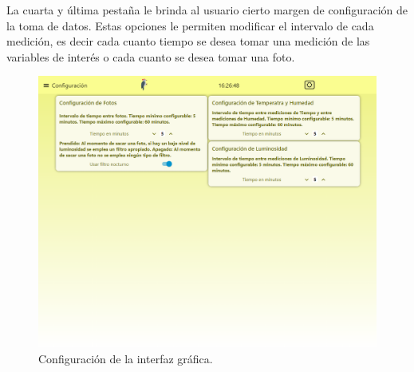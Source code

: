 La cuarta y última pestaña le brinda al usuario cierto margen de configuración de la toma de datos. Estas opciones le permiten modificar el intervalo de cada medición, es decir cada cuanto tiempo se desea tomar una medición de las variables de interés o cada cuanto se desea tomar una foto.
\begin{figure}[H]
	\centering
    \includegraphics[width=0.7\linewidth]{ImagenesIngenieria de Detalle/Node-Red-Bird-Config}	
	\caption{Configuración de la interfaz gráfica.}
	\label{fig:node_red_config}
\end{figure}

